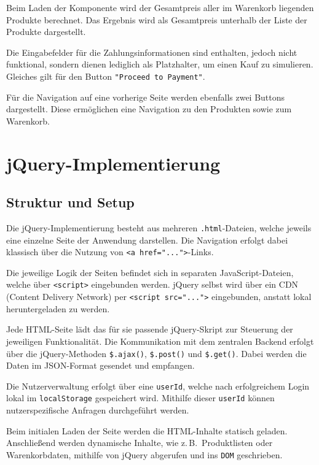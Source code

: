\documentclass[oneside]{ausarbeitung}
\begin{document}
Beim Laden der Komponente wird der Gesamtpreis aller im Warenkorb liegenden Produkte berechnet. Das Ergebnis wird als Gesamtpreis unterhalb der Liste der Produkte dargestellt. 

Die Eingabefelder für die Zahlungsinformationen sind enthalten, jedoch nicht funktional, sondern dienen lediglich als Platzhalter, um einen Kauf zu simulieren. Gleiches gilt für den Button \texttt{"Proceed to Payment"}.

Für die Navigation auf eine vorherige Seite werden ebenfalls zwei Buttons dargestellt. Diese ermöglichen eine Navigation zu den Produkten sowie zum Warenkorb.


\section{jQuery-Implementierung}

\subsection{Struktur und Setup}

Die jQuery-Implementierung besteht aus mehreren \texttt{.html}-Dateien, welche jeweils eine einzelne Seite der Anwendung darstellen. Die Navigation erfolgt dabei klassisch über die Nutzung von \texttt{<a href="...">}-Links.

Die jeweilige Logik der Seiten befindet sich in separaten JavaScript-Dateien, welche über \texttt{<script>} eingebunden werden. jQuery selbst wird über ein CDN (Content Delivery Network) per \texttt{<script src="...">} eingebunden, anstatt lokal heruntergeladen zu werden.

Jede \ac{HTML}-Seite lädt das für sie passende jQuery-Skript zur Steuerung der jeweiligen Funktionalität. Die Kommunikation mit dem zentralen Backend erfolgt über die jQuery-Methoden \texttt{\$.\allowbreak ajax()}, \texttt{\$.\allowbreak post()} und \texttt{\$.\allowbreak get()}. Dabei werden die Daten im JSON-Format gesendet und empfangen.

Die Nutzerverwaltung erfolgt über eine \texttt{userId}, welche nach erfolgreichem Login lokal im \texttt{localStorage} gespeichert wird. Mithilfe dieser \texttt{userId} können nutzerspezifische Anfragen durchgeführt werden.

Beim initialen Laden der Seite werden die \ac{HTML}-Inhalte statisch geladen. Anschließend werden dynamische Inhalte, wie z.\,B.\ Produktlisten oder Warenkorbdaten, mithilfe von jQuery abgerufen und ins \texttt{DOM} geschrieben.
\end{document}
